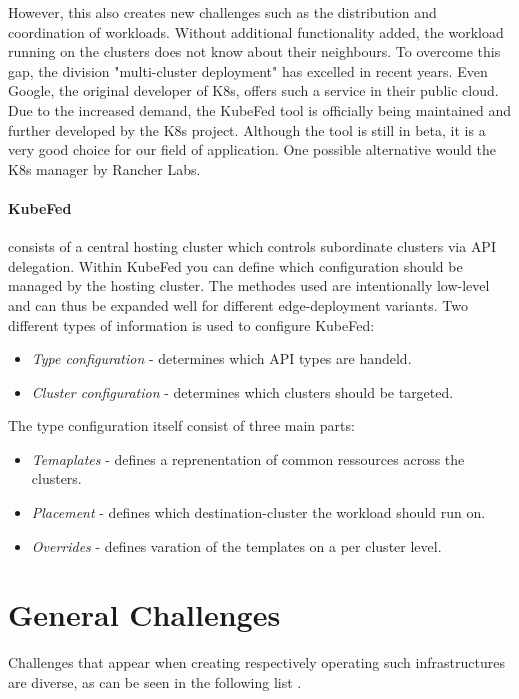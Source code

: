 \documentclass[MSC,Master,english]{twbook}%
\begin{document}
However, this also creates new challenges such as the distribution and coordination of workloads. Without additional functionality added, the workload running on the clusters does not know about their neighbours. To overcome this gap, the division  "multi-cluster deployment" has excelled in recent years. Even Google, the original developer of \ac{K8s}, offers such a service \cite{google-mcs} in their public cloud. Due to the increased demand, the \ac{KubeFed} tool is officially being maintained and further developed by the \ac{K8s} project\cite{kubefed-github}. Although the tool is still in beta, it is a very good choice for our field of application. One possible alternative would the \ac{K8s} manager by Rancher Labs.

\paragraph{\ac{KubeFed}} consists of a central hosting cluster which controls subordinate clusters via \ac{API} delegation. Within \ac{KubeFed} you can define which configuration should be managed by the hosting cluster. The methodes used are intentionally low-level and can thus be expanded well for different edge-deployment variants. Two different types of information is used to configure \ac{KubeFed}\cite{kubefed-github}:

\begin{itemize}
    \item \textit{Type configuration} - determines which \ac{API} types are handeld.
    \item \textit{Cluster configuration} - determines which clusters should be targeted.
\end{itemize}

The type configuration itself consist of three main parts:

\begin{itemize}
    \item \textit{Temaplates} - defines a reprenentation of common ressources across the clusters.
    \item \textit{Placement} - defines which destination-cluster the workload should run on.
    \item \textit{Overrides} - defines varation of the templates on a per cluster level.
\end{itemize}

\section{General Challenges} 
\label{sec:generalchallanges}
Challenges that appear when creating respectively operating such infrastructures are diverse, as can be seen in the following list \cite{intro-edge}.
\end{document}
